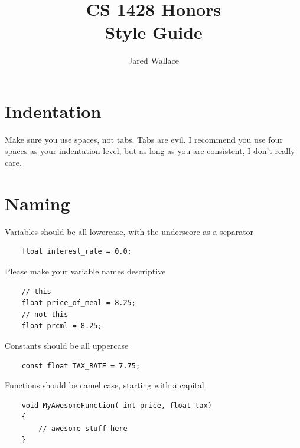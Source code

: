 \documentclass[letterpaper,12pt]{article}
\title{\Large CS 1428 Honors\\Style Guide}
\author{Jared Wallace}
\date{}
\begin{document}
\maketitle

\vspace{30mm}

\section*{Indentation}
Make sure you use spaces, not tabs. Tabs are evil.
I recommend you use four spaces as your indentation level, but as long
as you are consistent, I don't really care.

\section*{Naming}
Variables should be all lowercase, with the underscore as a separator
\begin{lstlisting}
    float interest_rate = 0.0;
\end{lstlisting}
Please make your variable names
descriptive
\begin{lstlisting}
    // this
    float price_of_meal = 8.25;
    // not this
    float prcml = 8.25;
\end{lstlisting}
Constants should be all uppercase
\begin{lstlisting}
    const float TAX_RATE = 7.75;
\end{lstlisting}
Functions should be camel case, starting with a capital
\begin{lstlisting}
    void MyAwesomeFunction( int price, float tax)
    {
        // awesome stuff here
    }
\end{lstlisting}
\end{document}
